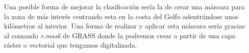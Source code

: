 Una posible forma de mejorar la clasificación sería la de crear una máscara para la zona de más interés centrando esta en la costa del Golfo adentrándose unos kilómetros al interior. Una forma de realizar y aplicar esta máscara sería gracias al comando \textit{r.mask} de GRASS donde la podremos crear a partir de una capa ráster o vectorial que tengamos digitalizada.